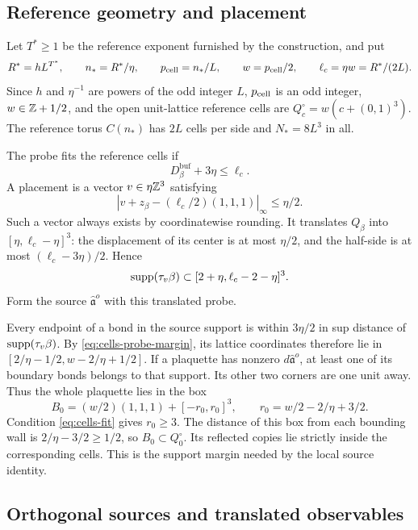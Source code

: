 \subsection{Reference geometry and placement}

Let $T^*\ge1$ be the reference exponent furnished by the
construction, and put
\[
 R^*=hL^{T^*},\qquad n_*=R^*/\eta,\qquad
 p_{\rm cell}=n_*/L,\qquad w=p_{\rm cell}/2,\qquad \ell_c=\eta w=R^*/(2L).
\]
Since $h$ and $\eta^{-1}$ are powers of the odd integer $L$,
$p_{\rm cell}$ is an odd integer, $w\in\mathbb Z+1/2$, and the open unit-lattice
reference cells are $Q_c^\circ=w(c+(0,1)^3)$.
The reference torus $C(n_*)$ has $2L$ cells per side and
$N_*=8L^3$ in all.

The probe fits the reference cells if
\begin{equation}\label{eq:cells-fit}
 D_\beta^{\mathrm{buf}}+3\eta\le\ell_c.
\end{equation}
A placement is a vector $v\in\eta\mathbb Z^3$ satisfying
\[
 |v+z_\beta-(\ell_c/2)(1,1,1)|_\infty\le\eta/2.
\]
Such a vector always exists by coordinatewise rounding.
It translates $Q_\beta$ into $[\eta,\ell_c-\eta]^3$:
the displacement of its center is at most $\eta/2$, and
the half-side is at most $(\ell_c-3\eta)/2$.
Hence
\begin{equation}\label{eq:cells-probe-margin}
 \operatorname{supp}(\tau_v\beta)
                     \subset[2+\eta,\ell_c-2-\eta]^3.
\end{equation}
Form the source $\hat{\mathfrak a}^o$ with this translated
probe.

Every endpoint of a bond in the source support is within
$3\eta/2$ in sup distance of $\operatorname{supp}(\tau_v\beta)$.
By \eqref{eq:cells-probe-margin}, its lattice coordinates
therefore lie in
$[2/\eta-1/2,w-2/\eta+1/2]$.
If a plaquette has nonzero $d\hat{\mathfrak a}^o$, at least
one of its boundary bonds belongs to that support. Its
other two corners are one unit away. Thus the whole
plaquette lies in the box
\begin{equation}\label{eq:cells-support-box}
 B_0=(w/2)(1,1,1)+[-r_0,r_0]^3,\qquad
 r_0=w/2-2/\eta+3/2.
\end{equation}
Condition \eqref{eq:cells-fit} gives $r_0\ge3$.
The distance of this box from each bounding wall is
$2/\eta-3/2\ge1/2$, so $B_0\subset Q_0^\circ$.
Its reflected copies lie strictly inside the corresponding
cells. This is the support margin needed by the local
source identity.

\subsection{Orthogonal sources and translated observables}


